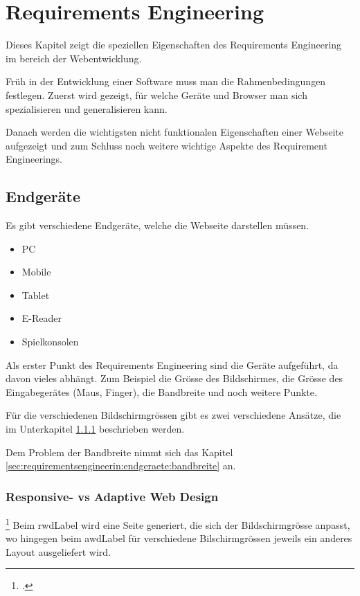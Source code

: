\setcounter{secnumdepth}{3}
\chapter{Requirements Engineering}
\label{sec:requirementsengineering}
Dieses Kapitel zeigt die speziellen Eigenschaften des Requirements Engineering im bereich der Webentwicklung.

Früh in der Entwicklung einer Software muss man die Rahmenbedingungen festlegen. Zuerst wird gezeigt, für welche Geräte und Browser man sich spezialisieren und generalisieren kann. 

Danach werden die wichtigsten nicht funktionalen Eigenschaften einer Webseite aufgezeigt und zum Schluss noch weitere wichtige Aspekte des Requirement Engineerings.

\section{Endgeräte}
Es gibt verschiedene Endgeräte, welche die Webseite darstellen müssen. 
\begin{itemize}
\item PC
\item Mobile
\item Tablet
\item E-Reader
\item Spielkonsolen
\end{itemize}

Als erster Punkt des Requirements Engineering sind die Geräte aufgeführt, da davon vieles abhängt. Zum Beispiel die Grösse des Bildschirmes, die Grösse des Eingabegerätes (Maus, Finger), die Bandbreite und noch weitere Punkte.

Für die verschiedenen Bildschirmgrössen gibt es zwei verschiedene Ansätze, die im Unterkapitel \ref{sec:requirementsengineerin:endgeraete:responsivevsadaptive}  beschrieben werden.

Dem Problem der Bandbreite nimmt sich das Kapitel \ref{sec:requirementsengineerin:endgeraete:bandbreite}  an.

\subsection{Responsive- vs Adaptive Web Design}
\label{sec:requirementsengineerin:endgeraete:responsivevsadaptive}
\footcite{Responsive_vs_Adaptive_Design_2015-05-31}
Beim \gls{rwdLabel} wird eine Seite generiert, die sich der Bildschirmgrösse anpasst, wo hingegen beim \gls{awdLabel} für verschiedene Bilschirmgrössen jeweils ein anderes Layout ausgeliefert wird.

